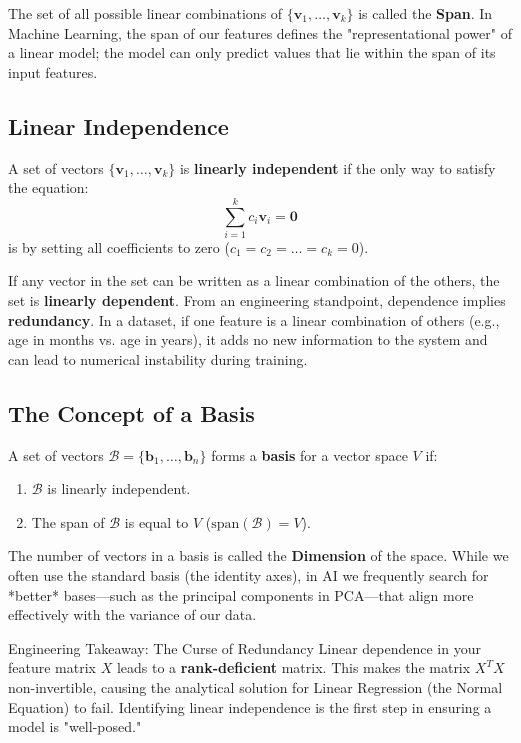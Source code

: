 The set of all possible linear combinations of $\{\mathbf{v}_1, \dots, \mathbf{v}_k\}$ is called the \textbf{Span}. In Machine Learning, the span of our features defines the "representational power" of a linear model; the model can only predict values that lie within the span of its input features.



\subsection{Linear Independence}
A set of vectors $\{\mathbf{v}_1, \dots, \mathbf{v}_k\}$ is \textbf{linearly independent} if the only way to satisfy the equation:
\begin{equation}
    \sum_{i=1}^k c_i\mathbf{v}_i = \mathbf{0}
\end{equation}
is by setting all coefficients to zero ($c_1 = c_2 = \dots = c_k = 0$).

If any vector in the set can be written as a linear combination of the others, the set is \textbf{linearly dependent}. From an engineering standpoint, dependence implies \textbf{redundancy}. In a dataset, if one feature is a linear combination of others (e.g., age in months vs. age in years), it adds no new information to the system and can lead to numerical instability during training.



\subsection{The Concept of a Basis}
A set of vectors $\mathcal{B} = \{\mathbf{b}_1, \dots, \mathbf{b}_n\}$ forms a \textbf{basis} for a vector space $V$ if:
\begin{enumerate}
    \item $\mathcal{B}$ is linearly independent.
    \item The span of $\mathcal{B}$ is equal to $V$ ($\text{span}(\mathcal{B}) = V$).
\end{enumerate}

The number of vectors in a basis is called the \textbf{Dimension} of the space. While we often use the standard basis (the identity axes), in AI we frequently search for *better* bases—such as the principal components in PCA—that align more effectively with the variance of our data.

\begin{unibobox}{Engineering Takeaway: The Curse of Redundancy}
    Linear dependence in your feature matrix $X$ leads to a \textbf{rank-deficient} matrix. This makes the matrix $X^TX$ non-invertible, causing the analytical solution for Linear Regression (the Normal Equation) to fail. Identifying linear independence is the first step in ensuring a model is "well-posed."
\end{unibobox}

